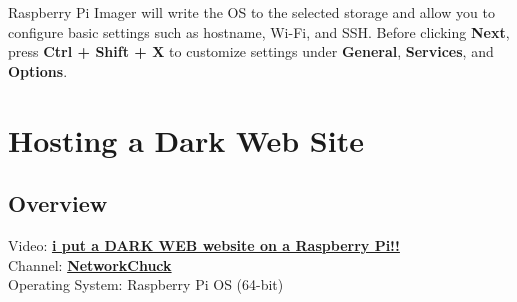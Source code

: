 \documentclass[a4paper,12pt]{article}
\begin{document}
Raspberry Pi Imager will write the OS to the selected storage and allow you to configure basic settings such as hostname, Wi-Fi, and SSH. Before clicking \textbf{Next}, press \textbf{Ctrl + Shift + X} to customize settings under \textbf{General}, \textbf{Services}, and \textbf{Options}.

\section{Hosting a Dark Web Site}

\subsection{Overview}
Video: \href{https://www.youtube.com/watch?v=bllS9tkCkaM}{\textbf{\color{blue}i put a DARK WEB website on a Raspberry Pi!!}} \\
Channel: \href{https://www.youtube.com/c/NetworkChuck}{\textbf{\color{blue}NetworkChuck}} \\
Operating System: Raspberry Pi OS (64-bit)
\end{document}
